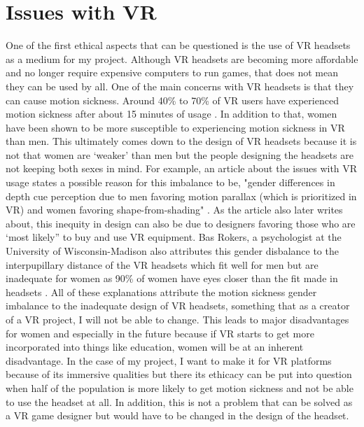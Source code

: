 \documentclass[11pt,twocolumn]{article}
\begin{document}
\section{Issues with VR}
One of the first ethical aspects that can be questioned is the use of VR headsets as a medium for my project. Although VR headsets are becoming more affordable and no longer require expensive computers to run games, that does not mean they can be used by all. One of the main concerns with VR headsets is that they can cause motion sickness. Around 40\% to 70\% of VR users have experienced motion sickness after about 15 minutes of usage \cite{motionsicknessvr2019}. In addition to that, women have been shown to be more susceptible to experiencing motion sickness in VR than men. This ultimately comes down to the design of VR headsets because it is not that women are ‘weaker’ than men but the people designing the headsets are not keeping both sexes in mind. For example, an article about the issues with VR usage states a possible reason for this imbalance to be, "gender differences in depth cue perception due to men favoring motion parallax (which is prioritized in VR) and women favoring shape-from-shading" \cite{vrbarriers2018}. As the article also later writes about, this inequity in design can also be due to designers favoring those who are ‘most likely” to buy and use VR equipment\cite{vrbarriers2018}. Bas Rokers, a psychologist at the University of Wisconsin-Madison also attributes this gender disbalance to the interpupillary distance of the VR headsets which fit well for men but are inadequate for women as 90\% of women have eyes closer than the fit made in headsets \cite{motionsicknessvr2019}. All of these explanations attribute the motion sickness gender imbalance to the inadequate design of VR headsets, something that as a creator of a VR project, I will not be able to change. This leads to major disadvantages for women and especially in the future because if VR starts to get more incorporated into things like education, women will be at an inherent disadvantage. In the case of my project, I want to make it for VR platforms because of its immersive qualities but there its ethicacy can be put into question when half of the population is more likely to get motion sickness and not be able to use the headset at all. In addition, this is not a problem that can be solved as a VR game designer but would have to be changed in the design of the headset. 
\end{document}

